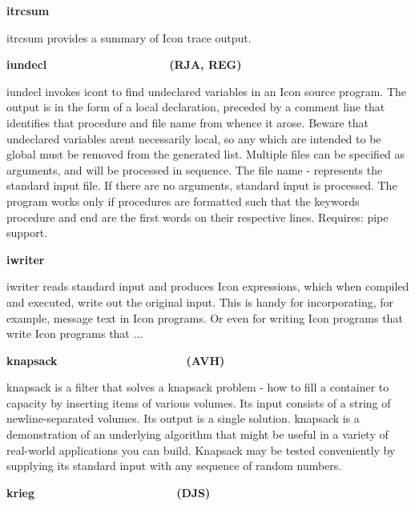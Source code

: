 {{\sffamily\bfseries
itrcsum\ \ \ \ \ \ \ \ \ \ \ \ \ \ \ \ \ \ \ \ }

\textsf{itrcsum} provides a summary of Icon trace output.

{\sffamily\bfseries
iundecl\ \ \ \ \ \ \ \ \ \ \ \ \ \ \ \ \ \  \ (RJA, REG)}

\textsf{iundecl} invokes icont to find undeclared variables in an Icon
source program. The output is in the form of a
{\textquotedbl}local{\textquotedbl} declaration, preceded by a comment
line that identifies that procedure and file name from whence it arose.
Beware that undeclared variables aren{\textquotesingle}t necessarily
local, so any which are intended to be global must be removed from the
generated list. Multiple files can be specified as arguments, and will
be processed in sequence. The file name {\textquotedbl}-{\textquotedbl}
represents the standard input file. If there are no arguments, standard
input is processed. The program works only if procedures are formatted
such that the keywords {\textquotedbl}procedure{\textquotedbl} and
{\textquotedbl}end{\textquotedbl} are the first words on their
respective lines. Requires: pipe support.

{\sffamily\bfseries
iwriter\ \ \ \ \ \ \ \ \ \ \ \ \ \ \ \ \ \ \ \ }

\textsf{iwriter} reads standard input and produces Icon expressions,
which when compiled and executed, write out the original input. This is
handy for incorporating, for example, message text in Icon programs. Or
even for writing Icon programs that write Icon programs that ... 

{\sffamily\bfseries
knapsack\ \ \ \ \ \ \ \ \ \ \ \ \ \ \ \ \ \ \ \ (AVH)}

\textsf{knapsack} is a filter that solves a knapsack problem - how to
fill a container to capacity by inserting items of various volumes. Its
input consists of a string of newline-separated volumes. Its output is
a single solution. knapsack is a demonstration of an underlying
algorithm that might be useful in a variety of real-world applications
you can build. Knapsack may be tested conveniently by supplying its
standard input with any sequence of random numbers. 

{\sffamily\bfseries
krieg\ \ \ \ \ \ \ \ \ \ \ \ \ \ \ \ \ \ \ \ \ \ (DJS)}

}

